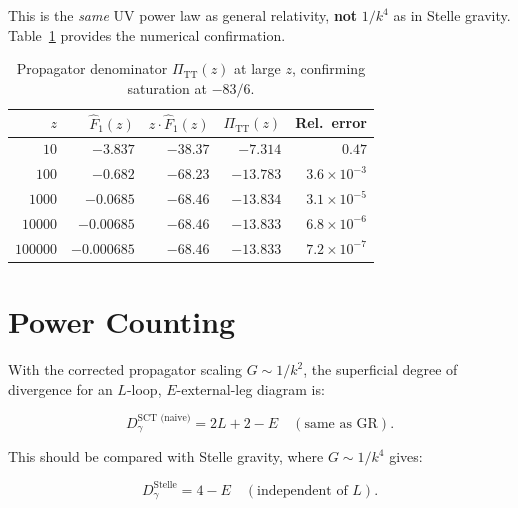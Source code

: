 \documentclass[12pt,a4paper]{article}
\begin{document}
\noindent This is the \emph{same} UV power law as general relativity,
\textbf{not} $1/k^4$ as in Stelle gravity. Table~\ref{tab:propagator}
provides the numerical confirmation.

\begin{table}[H]
\centering
\caption{Propagator denominator $\Pi_{\mathrm{TT}}(z)$ at large $z$,
confirming saturation at $-83/6$.}
\label{tab:propagator}
\begin{tabular}{rrrrr}
\toprule
$z$ & $\hat{F}_1(z)$ & $z\cdot\hat{F}_1(z)$ & $\Pi_{\mathrm{TT}}(z)$ & Rel.\ error \\
\midrule
$10$      & $-3.837$       & $-38.37$   & $-7.314$    & $0.47$ \\
$100$     & $-0.682$       & $-68.23$   & $-13.783$   & $3.6\times10^{-3}$ \\
$1000$    & $-0.0685$      & $-68.46$   & $-13.834$   & $3.1\times10^{-5}$ \\
$10000$   & $-0.00685$     & $-68.46$   & $-13.833$   & $6.8\times10^{-6}$ \\
$100000$  & $-0.000685$    & $-68.46$   & $-13.833$   & $7.2\times10^{-7}$ \\
\bottomrule
\end{tabular}
\end{table}

\section{Power Counting}
\label{sec:power_counting}

With the corrected propagator scaling $G \sim 1/k^2$, the superficial
degree of divergence for an $L$-loop, $E$-external-leg diagram is:

\begin{equation}
  D_\gamma^{\text{SCT (naive)}} = 2L + 2 - E
  \quad (\text{same as GR}).
  \label{eq:D_naive}
\end{equation}

\noindent This should be compared with Stelle gravity, where $G \sim 1/k^4$ gives:

\begin{equation}
  D_\gamma^{\text{Stelle}} = 4 - E
  \quad (\text{independent of } L).
  \label{eq:D_stelle}
\end{equation}
\end{document}
